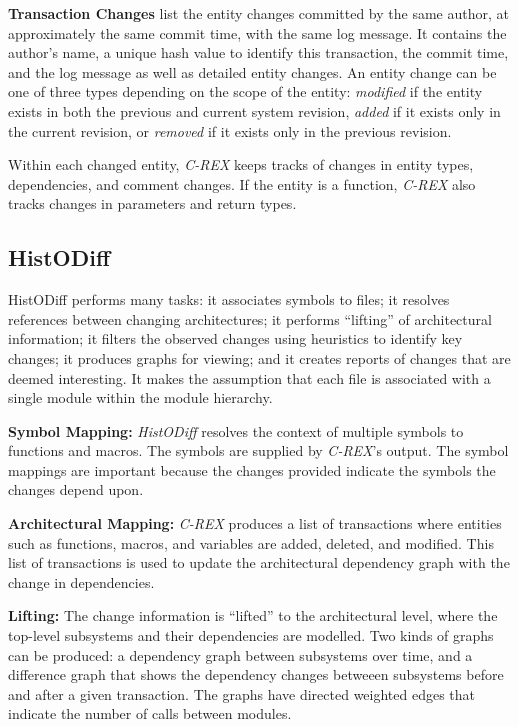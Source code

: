 \documentclass[times, 10pt,twocolumn]{article}
\newcommand{\histodiff}{\emph{HistODiff}\xspace}
\newcommand{\crex}{\emph{C-REX}\xspace}
\newcommand{\Subsection}[1]{\subsection{#1}}
\begin{document}

\textbf{Transaction Changes} list the entity changes committed by the same
author, at approximately the same commit time, with the same log message.
It contains the author's name, a unique hash value to identify this
transaction, the commit time, and the log message as well as detailed
entity changes.  An entity change can be one of three types depending on
the scope of the entity: \emph{modified} if the entity exists in both the
previous and current system revision, \emph{added} if it exists only in the
current revision, or \emph{removed} if it exists only in the previous
revision.

Within each changed entity, \crex keeps tracks of changes in entity types,
dependencies, and comment changes.  If the entity is a function, \crex also
tracks changes in parameters and return types.



\Subsection{HistODiff}


HistODiff performs many tasks:  it associates symbols to files; it resolves
references between changing architectures; it performs ``lifting'' of
architectural information; it filters the observed changes using heuristics
to identify key changes; it produces graphs for viewing; and it creates
reports of changes that are deemed interesting.  It makes the assumption
that each file is associated with a single module within the module
hierarchy.

\textbf{Symbol Mapping:} \histodiff resolves the context of multiple
symbols to functions and macros. The symbols are supplied by \crex's
output. The symbol mappings are important because the changes provided
indicate the symbols the changes depend upon.

\textbf{Architectural Mapping:} \crex produces a list of transactions where
entities such as functions, macros, and variables are added, deleted, and
modified. This list of transactions is used to update the architectural
dependency graph with the change in dependencies.

\textbf{Lifting:} The change information is ``lifted'' to the architectural
level, where the top-level subsystems and their dependencies are modelled.
Two kinds of graphs can be produced: a dependency graph between subsystems
over time, and a difference graph that shows the dependency changes
betweeen subsystems before and after a given transaction.  The graphs have
directed weighted edges that indicate the number of calls between modules.
\end{document}
